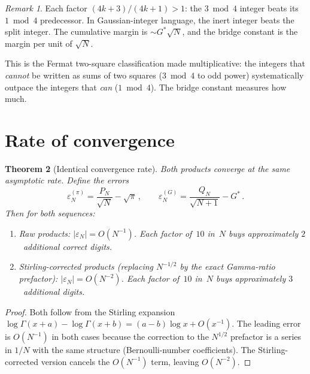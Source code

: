 \documentclass[12pt,reqno]{amsart}
\newtheorem{theorem}{Theorem}[section]
\theoremstyle{definition}
\theoremstyle{remark}
\newtheorem{remark}[theorem]{Remark}
\newcommand{\Gstar}{G^{\!*}}
\newcommand{\abs}[1]{\lvert #1 \rvert}
\begin{document}
\begin{remark}\label{rem:race2-meaning}
Each factor $(4k+3)/(4k+1)>1$: the $3\bmod 4$ integer beats its
$1\bmod 4$ predecessor.  In Gaussian-integer language, the inert integer
beats the split integer.  The cumulative margin is
$\sim\!\Gstar\sqrt{N}$, and the bridge constant is the margin per
unit of $\sqrt{N}$.

This is the Fermat two-square classification made multiplicative: the
integers that \emph{cannot} be written as sums of two squares ($3\bmod 4$
to odd power) systematically outpace the integers that \emph{can}
($1\bmod 4$).  The bridge constant measures how much.
\end{remark}


\section{Rate of convergence}

\begin{theorem}[Identical convergence rate]\label{thm:rate}
Both products converge at the same asymptotic rate.  Define the errors
\[
  \varepsilon_{N}^{(\pi)} = \frac{P_{N}}{\sqrt{N}} - \sqrt{\pi}\,,
  \qquad
  \varepsilon_{N}^{(G)} = \frac{Q_{N}}{\sqrt{N+1}} - \Gstar\,.
\]
Then for both sequences:
\begin{enumerate}[label=\textup{(\roman*)}]
  \item Raw products: $\abs{\varepsilon_{N}} = O(N^{-1})$.
    Each factor of~$10$ in~$N$ buys approximately $2$~additional
    correct digits.
  \item Stirling-corrected products \textup{(}replacing $N^{-1/2}$ by
    the exact Gamma-ratio prefactor\textup{)}:
    $\abs{\varepsilon_{N}} = O(N^{-2})$.
    Each factor of~$10$ in~$N$ buys approximately $3$~additional digits.
\end{enumerate}
\end{theorem}

\begin{proof}
Both follow from the Stirling expansion
$\log\Gamma(x+a)-\log\Gamma(x+b) = (a-b)\log x + O(x^{-1})$.
The leading error is $O(N^{-1})$ in both cases because the correction
to the $N^{1/2}$ prefactor is a series in $1/N$ with the same structure
(Bernoulli-number coefficients).  The Stirling-corrected version cancels
the $O(N^{-1})$ term, leaving $O(N^{-2})$.
\end{proof}
\end{document}
